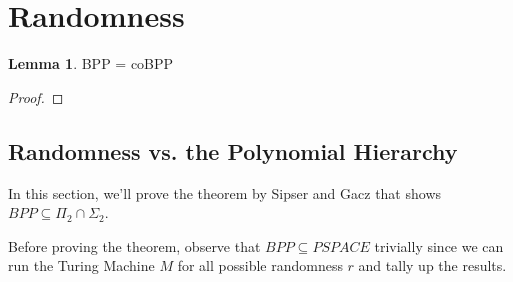\documentclass{article}
\theoremstyle{definition}
\newtheorem{lemma}[theorem]{Lemma}
\begin{document}
\newpage

\section{Randomness}

\begin{lemma}
    BPP = coBPP
\end{lemma}
\begin{proof}
    
\end{proof}

\subsection{Randomness vs. the Polynomial Hierarchy}

In this section, we'll prove the theorem by Sipser and Gacz that shows $BPP \subseteq \Pi_{2} \cap \Sigma_{2}$.

Before proving the theorem, observe that $BPP \subseteq PSPACE$ trivially since we can run the Turing Machine $M$ for all possible randomness $r$ and tally up the results.
\end{document}
